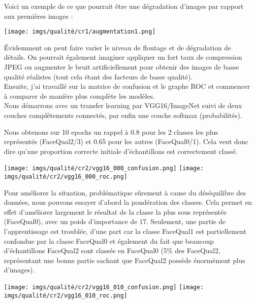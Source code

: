 Voici un exemple de ce que pourrait être une dégradation d'images par rapport aux premières images :

\begin{center}
\texttt{[image: imgs/qualité/cr1/augmentation1.png]}
\end{center}

Évidemment on peut faire varier le niveau de floutage et de dégradation de détails. On pourrait également imaginer appliquer un fort taux de compression JPEG ou augmenter le bruit artificiellement pour obtenir des images de basse qualité réalistes (tout cela étant des facteurs de basse qualité).\\

Ensuite, j'ai travaillé sur la matrice de confusion et le graphe ROC et commencer à comparer de manière plus complète les modèles.\\

Nous démarrons avec un transfer learning par VGG16/ImageNet suivi de deux couches complètements connectés, par enfin une couche softmax (probabilités).

Nous obtenons sur 10 epochs un rappel à 0.8 pour les 2 classes les plus représentés (FaceQual2/3) et 0.65 pour les autres (FaceQual0/1). Cela veut donc dire qu'une proportion correcte initiale d'échantillons est correctement classé.

\begin{center}
    \texttt{[image: imgs/qualité/cr2/vgg16\_000\_confusion.png]}
    \texttt{[image: imgs/qualité/cr2/vgg16\_000\_roc.png]}
\end{center}

Pour améliorer la situation, problématique sûrement à cause du déséquilibre des données, nous pouvons essayer d'abord la pondération des classes. Cela permet en effet d'améliorer largement le résultat de la classe la plus sous représentée (FaceQual0), avec un poids d'importance de 17. Seulement, une partie de l'apprentissage est troublée, d'une part car la classe FaceQual1 est partiellement confondue par la classe FaceQual0 et également du fait que beaucoup d'échantillons FaceQual2 sont classés en FaceQual0 (5\% des FaceQual2, représentant une bonne partie sachant que FaceQual2 possède énormément plus d'images).


\begin{center}
    \texttt{[image: imgs/qualité/cr2/vgg16\_010\_confusion.png]}
    \texttt{[image: imgs/qualité/cr2/vgg16\_010\_roc.png]}
\end{center}

